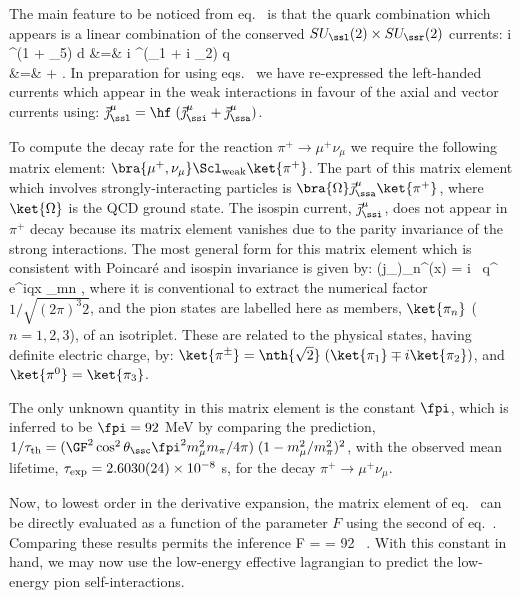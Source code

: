 \documentclass[12pt]{report}
\begin{document}
The main feature to be noticed from 
eq.~ is that the quark combination
which appears is a linear combination of the conserved
$SU_\ssl(2) 
\times SU_\ssr(2)$ currents:
%
\bg
\label{wkcurrentreln}
i \ubr \gamma^\mu (1 + \gamma_5) d &=&
 i \qbr \gamma^\mu \Pl (\tau_1 + i \tau_2)
\; q \nn\\
&=&  
+  .
\nd
%
In preparation for using eqs.~ we have
re-expressed the left-handed currents which appear in the
weak interactions in favour of the axial and vector
currents using: 
$\vec \jmath^\mu_\ssl = \hf \;( \vec \jmath^\mu_\ssi + \vec 
\jmath^\mu_\ssa)$.

To compute the decay rate for the reaction $\pi^+ \to \mu^+ 
\nu_\mu$ we require the following matrix element:
$\bra{\mu^+, 
\nu_\mu} \Scl_{\rm weak} \ket{\pi^+}$. The part of this
matrix element which involves strongly-interacting
particles is 
$\bra{\Omega} \vec \jmath^\mu_\ssa \ket{\pi^+}$, where 
$\ket{\Omega}$ is the QCD ground state. The isospin
current, 
$\vec \jmath^\mu_\ssi$, does not appear in $\pi^+$ decay
because its matrix element vanishes due to the parity
invariance of the strong interactions. The most general
form for this matrix element which is consistent with
Poincar\'e and isospin invariance is given by:
%
\eq
\label{pionmatrixelement}
\bra{\Omega} (j_\ssa)_n^\mu(x) 
 = {i \fpi \, q^\mu \; e^{iqx}
\over {}} \; \delta_{mn} ,  \eeq
%
where it is conventional to extract the numerical factor
$1/\sqrt{(2 \pi)^3 2}$, and the pion states are labelled
here as members, 
$\ket{\pi_n}$ ($n=1,2,3$), of an isotriplet. These are
related to the physical states, having definite electric
charge, by: 
$\ket{\pi^\pm} = \nth{\sqrt{2}} \; ( \ket{\pi_1} \mp i 
\ket{\pi_2})$, and $\ket{\pi^0} = \ket{\pi_3}$.

The only unknown quantity in this matrix element is the
constant $\fpi$, which is inferred to be $\fpi = 92$ MeV by
comparing the prediction, $1/\tau_{\rm th} = (\GF^2
\cos^2\theta_\ssc \fpi^2 m_\mu^2 m_\pi/4 \pi) \; 
(1 - m_\mu^2 / m_\pi^2)^2$, with the observed mean 
lifetime, $\tau_{\rm exp} = 2.6030(24) \times 
10^{-8}$ s, for the decay $\pi^+ \to \mu^+ \nu_\mu$.

Now, to lowest order in the derivative expansion, the
matrix element of eq.~ can be
directly evaluated as a function of the parameter $F$ using
the second of  eq.~. Comparing these 
results permits the inference
%
\eq
\label{thevalueforf}
F = \fpi = 92 \, \MeV.
\eeq
%
With this constant in hand, we may now use the low-energy
effective lagrangian to predict the low-energy pion
self-interactions.
\end{document}

